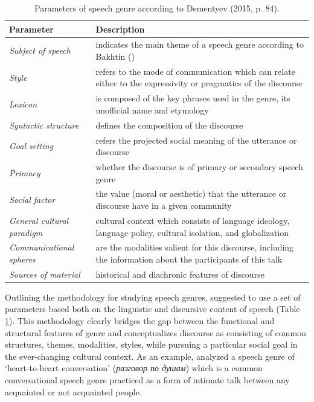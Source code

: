 \documentclass[12pt]{article}
\begin{document}
\begin{table}[ht]
\centering
\caption{Parameters of speech genre according to Dementyev (2015, p. 84).}
\label{sg-parameters}
\begin{tabular}{|l p{4.5in}|}
\hline
\textbf{Parameter} & \textbf{Description}\\
\hline
\textit{Subject of speech} & indicates the main theme of a speech genre according to Bakhtin (\citeyear{bakhtin1986})\\ \hline
\textit{Style} & refers to the mode of communication which can relate either to the expressivity or pragmatics of the discourse\\ \hline
\textit{Lexicon} & is composed of the key phrases used in the genre, its unofficial name and etymology\\ \hline
\textit{Syntactic structure}& defines the composition of the discourse\\ \hline
\textit{Goal setting} & refers the projected social meaning of the utterance or discourse\\ \hline
\textit{Primacy} & whether the discourse is of primary or secondary speech genre\\ \hline
\textit{Social factor }& the value (moral or aesthetic) that the utterance or discourse have in a given community\\ \hline
\textit{General cultural paradigm} & cultural context which consists of language ideology, language policy, cultural isolation, and globalization\\ \hline
\textit{Communicational spheres} & are the modalities salient for this discourse, including the information about the participants of this talk\\ \hline
\textit{Sources of material} & historical and diachronic features of discourse\\ 
\hline
\end{tabular}
\end{table}

Outlining the methodology for studying speech genres, \textcite{dementyev2015} suggested to use a set of parameters based both on the linguistic and discursive content of speech (Table \ref{sg-parameters}). This methodology clearly bridges the gap between the functional and structural features of genre and conceptualizes discourse as consisting of common structures, themes, modalities, styles, while pursuing a particular social goal in the ever-changing cultural context. As an example, \textcite{dementyev2015} analyzed a speech genre of `heart-to-heart conversation' (\foreignlanguage{russian}{\textit{разговор по душам}}) which is a common conversational speech genre practiced as a form of intimate talk between any acquainted or not acquainted people. 
\end{document}
